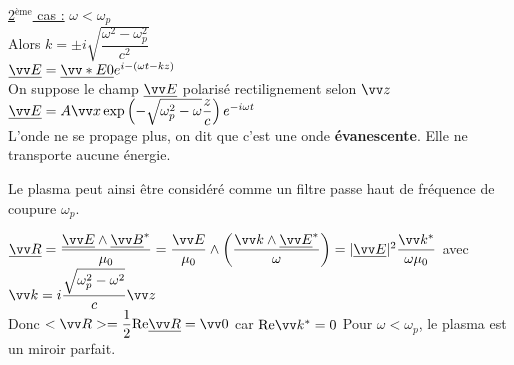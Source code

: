 \documentclass[a4paper]{article}
\begin{document}
\underline{2$^{\mathrm{ème}}$ cas :} $\omega<\omega_p$\\
Alors $k=\pm i \sqrt{\dfrac{\omega^2-\omega_p^2}{c^2}}$\\
$\underline{\vv E}=\underline{\vv*E0}e^{i-(\omega t-kz)}$\\
On suppose le champ $\underline{\vv E}$ polarisé rectilignement selon $\vv z$\\
$\underline{\vv E}=A\vv x\exp\left(-\sqrt{\omega_p^2-\omega}\dfrac{z}{c}\right)e^{-i\omega t}$\\
L'onde ne se propage plus, on dit que c'est une onde \textbf{évanescente}. Elle ne transporte aucune énergie.

Le plasma peut ainsi être considéré comme un filtre passe haut de fréquence de coupure $\omega_p$.\par
$\underline{\vv R}=\dfrac{\underline{\vv E}\wedge \underline{\vv B}^*}{\mu_0}=\dfrac{\vv E}{\mu_0}\wedge \left( \dfrac{\vv k\wedge \underline{\vv E}^*}{\omega} \right)=|\underline{\vv E}|^2 \dfrac{\vv k^*}{\omega\mu_0}$ avec $\vv k=i \dfrac{\sqrt{\omega_p^2-\omega^2}}{c}\vv z$\\
Donc $<\vv R>=\dfrac{1}{2}\text{Re} \underline{\vv R}=\vv 0$ car $\text{Re}\vv k^*=0$
Pour $\omega<\omega_p$, le plasma est un miroir parfait.
\end{document}
